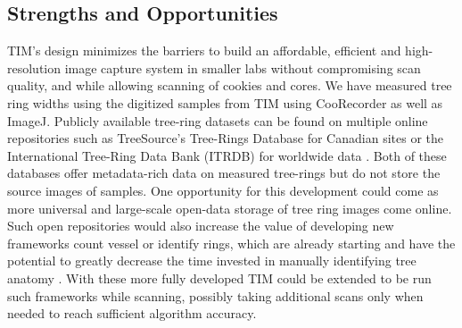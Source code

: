 \documentclass[a4paper,12pt]{article}
\begin{document}
\subsection{Strengths and Opportunities} %
TIM's design minimizes the barriers to build an affordable, efficient and high-resolution image capture system in smaller labs without compromising scan quality, and while allowing scanning of cookies and cores. We have measured tree ring widths using the digitized samples from TIM using CooRecorder as well as ImageJ. %
Publicly available tree-ring datasets can be found on multiple online repositories such as TreeSource's Tree-Rings Database for Canadian sites or the International Tree-Ring Data Bank (ITRDB) for worldwide data \citep{girardin_national_2021} \citep{grissino-mayer_international_1997}.
Both of these databases offer metadata-rich data on measured tree-rings but do not store the source images of samples.
One opportunity for this development could come as more universal and large-scale open-data storage of tree ring images come online. 
Such open repositories would also increase the value of developing new frameworks count vessel or identify rings, which are already starting and have the potential to greatly decrease the time invested in manually identifying tree anatomy \citep{resente_mask_2021} \citep{polacek_automation_2023}. 
With these more fully developed TIM could be extended to be run such frameworks while scanning, possibly taking additional scans only when needed to reach sufficient algorithm accuracy. %
\end{document}
